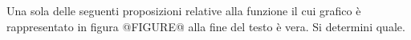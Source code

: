 Una sola delle seguenti proposizioni relative alla funzione il cui grafico è rappresentato
in figura @FIGURE@ alla fine del testo è vera. Si determini quale.
